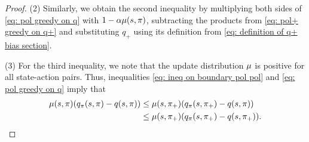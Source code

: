 \begin{proof}
(2)
Similarly, we obtain the second inequality
by multiplying both sides of \eqref{eq: pol greedy on q} with $ 1 - \alpha \mu(s, \pi)$,
subtracting the products from \eqref{eq: pol+ greedy on q+}
and substituting $q_+$ using its definition from \eqref{eq: definition of q+ bias section}.

(3)
For the third inequality, we note that the update distribution $\mu$ is positive for all state-action pairs. Thus, inequalities \eqref{eq: ineq on boundary pol pol} and \eqref{eq: pol greedy on q} imply that
\begin{align*}
    \mu(s, \pi) ( q_{\pi}(s, \pi) - q(s, \pi) )
    &\leq \mu(s, \pi_+)( q_{\pi}(s, \pi_+) - q(s, \pi) )
    \\
    &\leq \mu(s, \pi_+)( q_{\pi}(s, \pi_+) - q(s, \pi_+) ) .
\end{align*}
\end{proof}
